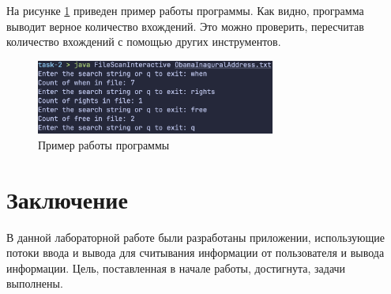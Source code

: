 \documentclass[a4paper, 14pt]{extarticle}
\begin{document}
На рисунке \ref{fig:task-2-2} приведен пример работы программы. Как видно,
программа выводит верное количество вхождений. Это можно проверить, пересчитав
количество вхождений с помощью других инструментов.

\begin{figure}[H]
  \centering
  \includegraphics[width=0.7\textwidth]{images/task-2.png}
  \caption{Пример работы программы}
  \label{fig:task-2-2}
\end{figure}

\section*{Заключение}

В данной лабораторной работе были разработаны приложении, использующие потоки
ввода и вывода для считывания информации от пользователя и вывода информации.
Цель, поставленная в начале работы, достигнута, задачи выполнены.
\end{document}
